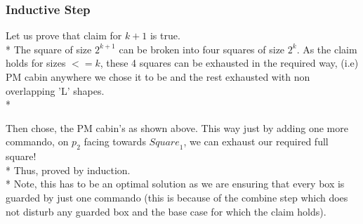 \documentclass{article}
\begin{document}
\begin{itemize}
\subsubsection{Inductive Step}
Let us prove that claim for $ k+1 $ is true. \\*
The square of size $2^{k+1}$ can be broken into four squares of size $2^{k}$. As the claim holds for sizes $<=k$, these 4 squares can be exhausted in the required way, (i.e) PM cabin anywhere we chose it to be and the rest exhausted with non overlapping 'L' shapes. \\*
\begin{center}
\end{center}
Then chose, the PM cabin's as shown above. This way just by adding one more commando, on $p_2$ facing towards ${Square}_1$, we can exhaust our required full square! \\*
Thus, proved by induction. \\*
Note, this has to be an optimal solution as we are ensuring that every box is guarded by just one commando (this is because of the combine step which does not disturb any guarded box and the base case for which the claim holds). 
\end{itemize}
\end{document}
